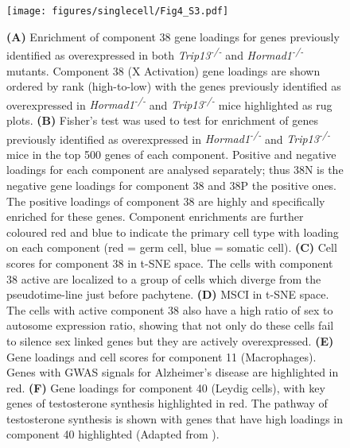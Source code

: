 \begin{figure}[H]
	\centering
	\texttt{[image: figures/singlecell/Fig4\_S3.pdf]}
	\caption[Misc. Components]{
		\textbf{(A)} Enrichment of component 38 gene loadings for genes previously identified as overexpressed in both \textit{Trip13\textsuperscript{-/-}} and \textit{Hormad1\textsuperscript{-/-}} mutants.
			Component 38 (X Activation) gene loadings are shown ordered by rank (high-to-low) with the genes previously identified as overexpressed in \textit{Hormad1\textsuperscript{-/-}} and \textit{Trip13\textsuperscript{-/-}} mice highlighted as rug plots.
		\textbf{(B)} Fisher’s test was used to test for enrichment of genes previously identified as overexpressed in \textit{Hormad1\textsuperscript{-/-}} and \textit{Trip13\textsuperscript{-/-}} mice in the top 500 genes of each component.
			Positive and negative loadings for each component are analysed separately; thus 38N is the negative gene loadings for component 38 and 38P the positive ones.
			The positive loadings of component 38 are highly and specifically enriched for these genes.
			Component enrichments are further coloured red and blue to indicate the primary cell type with loading on each component (red = germ cell, blue = somatic cell).
		\textbf{(C)} Cell scores for component 38 in t-SNE space.
			The cells with component 38 active are localized to a group of cells which diverge from the pseudotime-line just before pachytene.
		\textbf{(D)} MSCI in t-SNE space.
			The cells with active component 38 also have a high ratio of sex to autosome expression ratio, showing that not only do these cells fail to silence sex linked genes but they are actively overexpressed.
		\textbf{(E)} Gene loadings and cell scores for component 11 (Macrophages).
			Genes with GWAS signals for Alzheimer's disease are highlighted in red.
		\textbf{(F)} Gene loadings for component 40 (Leydig cells), with key genes of testosterone synthesis highlighted in red.
			The pathway of testosterone synthesis is shown with genes that have high loadings in component 40 highlighted (Adapted from \cite{Stojkov2013Orally}).
	}
	\label{fig:MiscComponents}
\end{figure}

